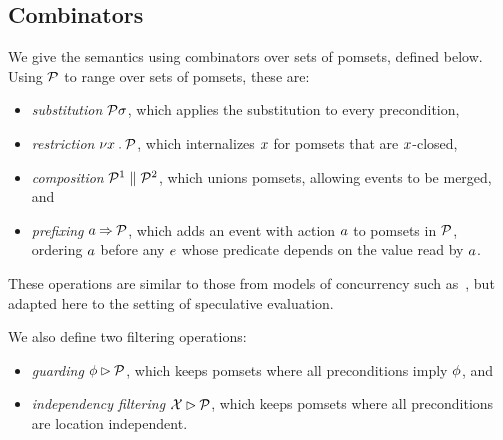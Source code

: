 \subsection{Combinators}

We give the semantics using combinators over sets of pomsets, defined below.
Using $\mathcal{P}$ to range over sets of pomsets, these are:
\begin{itemize}
\item \emph{substitution} $\mathcal{P}\sigma$, which applies the substitution to
  every precondition,
\item \emph{restriction} $\nu x\mathbin.\mathcal{P}$, which internalizes $x$ for
  pomsets that are $x$-closed,
\item \emph{composition} $\mathcal{P}^1\parallel\mathcal{P}^2$, which unions pomsets, allowing events to be merged, and
\item \emph{prefixing} $a\mathbin\Rightarrow\mathcal{P}$, which adds an event with action
  $a$ to pomsets in $\mathcal{P}$, ordering $a$ before any $e$ whose predicate
  depends on the value read by $a$.
\end{itemize}
These operations are similar to those from models of concurrency such
as~\cite{Brookes:1984:TCS:828.833}, but adapted here to the setting of
speculative evaluation.

We also define two filtering operations:
\begin{itemize}
\item \emph{guarding} $\phi\mathbin\rhd\mathcal{P}$, which
  keeps pomsets where all preconditions imply $\phi$, and
\item \emph{independency filtering} $\mathcal{X}\mathbin\rhd\mathcal{P}$, which keeps pomsets
  where all preconditions are location independent.
\end{itemize}


